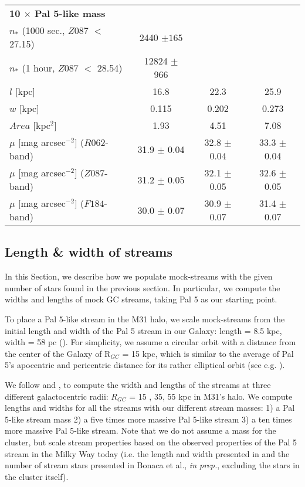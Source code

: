 \documentclass[twocolumn]{aastex62}
\begin{document}
\begin{table*}
\begin{tabular}{lccc}
\hline
{\bf 10 $\times$ Pal 5-like mass} & &&\\ 
$n_*$ (1000 sec., $Z087$ $<$ 27.15) &2440 $\pm 165$ & \\
$n_*$ (1 hour, $Z087$ $<$ 28.54) &12824 $\pm$ 966& \\
$l$ [kpc] &16.8 & 22.3 & 25.9 \\
$w$ [kpc]& 0.115 & 0.202 & 0.273  \\
$Area$ [kpc$^2$] &  1.93& 4.51   & 7.08  \\
$\mu$ [mag arcsec$^{-2}$] ($R062$-band) & 31.9 $\pm$ 0.04 &32.8 $\pm$ 0.04 &33.3 $\pm$ 0.04\\
$\mu$ [mag arcsec$^{-2}$] ($Z087$-band) &31.2 $\pm$ 0.05 &32.1 $\pm$ 0.05 &32.6 $\pm$ 0.05 \\
$\mu$ [mag arcsec$^{-2}$] ($F184$-band) & 30.0 $\pm$ 0.07& 30.9 $\pm$ 0.07 & 31.4 $\pm$ 0.07\\

\hline 
\end{tabular}
\end{table*}



\subsection{Length \& width of streams}
\label{sec:length}
In this Section, we describe how we populate mock-streams with the given number of stars found in the previous section. In particular, we compute the widths and lengths of mock GC streams, taking Pal 5 as our starting point. 

To place a Pal 5-like stream in the M31 halo, we scale mock-streams from the initial length and width of the Pal 5 stream in our Galaxy: length = 8.5 kpc, width = 58 pc (\citealt{ibata16}). For simplicity, we assume a circular orbit with a distance from the center of the Galaxy of R$_{GC}$ = 15 kpc, which is similar to the average of Pal 5's apocentric and pericentric distance for its rather elliptical orbit (see e.g. \citealt{erkal17}). 

We follow \citet{johnston98} and \citet{johnston01}, to compute the width and lengths of the streams at three different galactocentric radii: $R_{GC}$ = 15 , 35, 55 kpc in M31's halo. We compute lengths and widths for all the streams with our different stream masses: 1) a Pal 5-like stream mass 2) a five times more massive Pal 5-like stream 3) a ten times more massive Pal 5-like stream. Note that we do not  assume a mass for the cluster, but scale stream properties based on the observed properties of the Pal 5 stream in the Milky Way today (i.e. the length and width presented in \citet{ibata16} and the number of stream stars presented in Bonaca et al., {\it in prep.}, excluding the stars in the cluster itself).  
\end{document}

